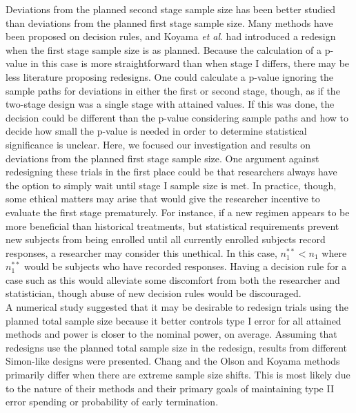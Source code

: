 \documentclass[12pt]{report}\usepackage[]{graphicx}\usepackage[]{color}
\newlength{\li}\setlength{\li}{14.48pt}
\newlength{\di}\setlength{\di}{-3.5mm}
\begin{document}
Deviations from the planned second stage sample size has been better studied than deviations from the planned first stage sample size. Many methods have been proposed on decision rules, and Koyama \textit{et al}. had introduced a redesign when the first stage sample size is as planned. Because the calculation of a p-value in this case is more straightforward than when stage I differs, there may be less literature proposing redesigns. One could calculate a p-value ignoring the sample paths for deviations in either the first or second stage, though, as if the two-stage design was a single stage with attained values. If this was done, the decision could be different than the p-value considering sample paths and how to decide how small the p-value is needed in order to determine statistical significance is unclear. Here, we focused our investigation and results on deviations from the planned first stage sample size. One argument against redesigning these trials in the first place could be that researchers always have the option to simply wait until stage I sample size is met. In practice, though, some ethical matters may arise that would give the researcher incentive to evaluate the first stage prematurely. For instance, if a new regimen appears to be more beneficial than historical treatments, but statistical requirements prevent new subjects from being enrolled until all currently enrolled subjects record responses, a researcher may consider this unethical. In this case, $n_1^{\ast\ast} < n_1$ where $n_1^{\ast\ast}$ would be subjects who have recorded responses. Having a decision rule for a case such as this would alleviate some discomfort from both the researcher and statistician, though abuse of new decision rules would be discouraged. \\
\indent A numerical study suggested that it may be desirable to redesign trials using the planned total sample size because it better controls type I error for all attained methods and power is closer to the nominal power, on average. Assuming that redesigns use the planned total sample size in the redesign, results from different Simon-like designs were presented.  Chang and the Olson and Koyama methods primarily differ when there are extreme sample size shifts. This is most likely due to the nature of their methods and their primary goals of maintaining type II error spending or probability of early termination. \\
\end{document}
